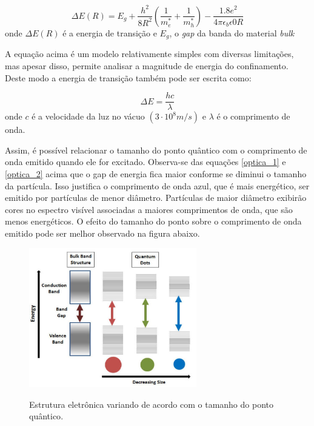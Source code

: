 \begin{equation}
	\label{optica_1}
	\Delta E(R) = E_{g} + \frac{h^2}{8R^2} \left(\frac{1}{m^{\ast}_{e}} + \frac{1}{m^{\ast}_{h}} \right) - \frac{1.8e^2}{4\pi \epsilon_{b} \epsilon{0}R}
\end{equation}
onde $\Delta E(R)$ é a energia de transição e $E_{g}$, o \textit{gap} da banda do material \textit{bulk}

A equação acima é um modelo relativamente simples com diversas limitações, mas apesar disso, permite analisar a magnitude de energia do confinamento\cite{optica2}\cite{bulk2}. Deste modo a energia de transição também pode ser escrita como:

\begin{equation}
	\label{optica_2}
	\Delta E = \frac{hc}{\lambda}
\end{equation}
onde $c$ é a velocidade da luz no vácuo $(3\cdot 10^8 m/s)$ e $\lambda$ é o comprimento de onda.

Assim, é possível relacionar o tamanho do ponto quântico com o comprimento de onda emitido quando ele for excitado. Observa-se das equações \eqref{optica_1} e \eqref{optica_2} acima  que  o gap de energia fica maior conforme se diminui o tamanho da partícula. Isso justifica o comprimento de onda azul, que é mais energético, ser emitido por partículas de menor diâmetro. Partículas de maior diâmetro exibirão cores no espectro visível associadas a maiores comprimentos de onda, que são menos energéticos. O efeito do tamanho do ponto sobre o comprimento de onda emitido pode ser melhor observado na figura abaixo. 

\begin{figure}[H]
  \centering
  \caption{Estrutura eletrônica variando de acordo com o tamanho do ponto quântico\cite{optica1}.}
  \includegraphics[width=0.65\textwidth]{images/figura17.jpg}
  \label{fig17}
\end{figure}